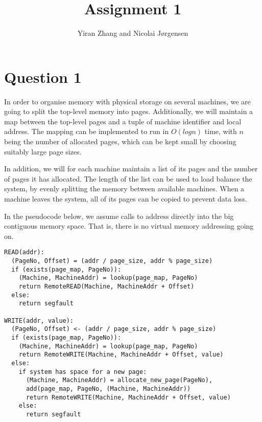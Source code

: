 \documentclass[11pt]{article}
\title          {Assignment 1}
\author         {Yiran Zhang and Nicolai Jørgensen}
\begin{document}
\maketitle
\newpage

\section{Question 1}

In order to organise memory with physical storage on several machines, we are
going to split the top-level memory into pages. Additionally, we will maintain a
map between the top-level pages and a tuple of machine identifier and local
address. The mapping can be implemented to run in $O(log n)$ time, with $n$ being the
number of allocated pages, which can be kept small by choosing suitably large
page sizes.

In addition, we will for each machine maintain a list of its pages and the
number of pages it has allocated. The length of the list can be used to load
balance the system, by evenly splitting the memory between available machines.
When a machine leaves the system, all of its pages can be copied to prevent data
loss.

In the pseudocode below, we assume calls to address directly into the big
contiguous memory space. That is, there is no virtual memory addressing going
on.
\begin{Verbatim}
READ(addr):
  (PageNo, Offset) = (addr / page_size, addr % page_size)
  if (exists(page_map, PageNo)):
    (Machine, MachineAddr) = lookup(page_map, PageNo)
    return RemoteREAD(Machine, MachineAddr + Offset)
  else:
    return segfault

WRITE(addr, value):
  (PageNo, Offset) <- (addr / page_size, addr % page_size)
  if (exists(page_map, PageNo)):
    (Machine, MachineAddr) = lookup(page_map, PageNo)
    return RemoteWRITE(Machine, MachineAddr + Offset, value)
  else:
    if system has space for a new page:
      (Machine, MachineAddr) = allocate_new_page(PageNo),
      add(page_map, PageNo, (Machine, MachineAddr))
      return RemoteWRITE(Machine, MachineAddr + Offset, value)
    else:
      return segfault
\end{Verbatim}
\end{document}
